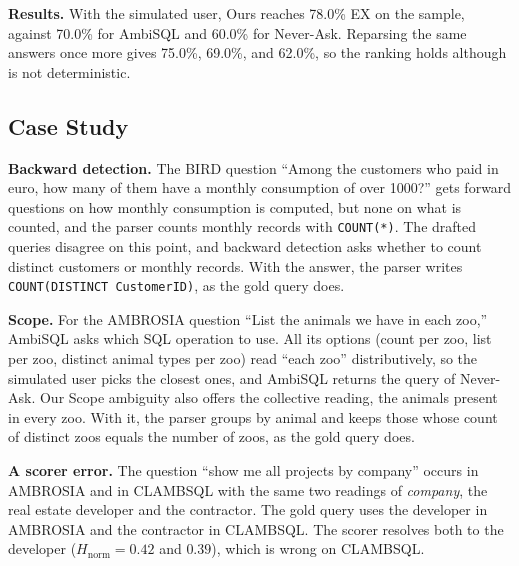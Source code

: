 \textbf{Results.} With the simulated user, Ours reaches 78.0\% EX on
the sample, against 70.0\% for AmbiSQL and 60.0\% for Never-Ask. Reparsing
the same answers once more gives 75.0\%, 69.0\%, and 62.0\%, so the
ranking holds although \terra{} is not deterministic.

\subsection{Case Study}
\label{sec:exp-case}

\textbf{Backward detection.} The BIRD question ``Among the customers
who paid in euro, how many of them have a monthly consumption of over
1000?'' gets forward questions on how monthly consumption is computed,
but none on what is counted, and the parser counts monthly records
with \texttt{COUNT(*)}. The drafted queries disagree on this point,
and backward detection asks whether to count distinct customers or
monthly records. With the answer, the parser writes
\texttt{COUNT(DISTINCT CustomerID)}, as the gold query does.

\textbf{Scope.} For the AMBROSIA question ``List the animals we have
in each zoo,'' AmbiSQL asks which SQL operation to use. All its
options (count per zoo, list per zoo, distinct animal types per zoo)
read ``each zoo'' distributively, so the simulated user picks the
closest ones, and AmbiSQL returns the query of Never-Ask. Our Scope
ambiguity also offers the collective reading, the animals present in
every zoo. With it, the parser groups by animal and keeps those whose
count of distinct zoos equals the number of zoos, as the gold query
does.

\textbf{A scorer error.} The question ``show me all
projects by company'' occurs in AMBROSIA and in CLAMBSQL with the same
two readings of \emph{company}, the real estate developer and the
contractor. The gold query uses the developer in AMBROSIA and the
contractor in CLAMBSQL. The scorer resolves both to the developer
($H_{\mathrm{norm}}=0.42$ and $0.39$), which is wrong on CLAMBSQL.

